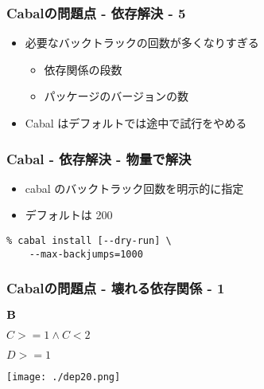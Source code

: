 \documentclass[cjk,dvipdfm,14pt]{beamer}
\begin{document}
\begin{frame}

\frametitle{Cabalの問題点 - 依存解決 - 5}

\begin{itemize}
\item 必要なバックトラックの回数が多くなりすぎる
  \begin{itemize}
  \item 依存関係の段数
  \item パッケージのバージョンの数
  \end{itemize}
\item Cabal はデフォルトでは途中で試行をやめる
\end{itemize}

\end{frame}

\begin{frame}[fragile]
\frametitle{Cabal - 依存解決 - 物量で解決}

\begin{itemize}
\item cabal のバックトラック回数を明示的に指定
\item デフォルトは 200
\end{itemize}

\begin{lstlisting}
% cabal install [--dry-run] \
    --max-backjumps=1000
\end{lstlisting}

\end{frame}


\begin{frame}
\frametitle{Cabalの問題点 - 壊れる依存関係 - 1}

\begin{description}
\item ${\bf B}$
\item
  \begin{description}
  \item $C >= 1 \wedge C < 2$
  \item $D >= 1$
  \end{description}
\end{description}

\texttt{[image: ./dep20.png]}

\end{frame}
\end{document}
